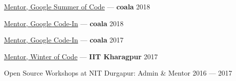 

\href{https://docs.naveenkumarsangi.me/gsoc-mentor.pdf}{Mentor, Google Summer of Code} --- \textbf{coala} \hfill 2018

\href{https://docs.naveenkumarsangi.me/gci-mentor-2018.pdf}{Mentor, Google Code-In} --- \textbf{coala} \hfill 2018

\href{https://docs.naveenkumarsangi.me/gci-mentor-2017.pdf}{Mentor, Google Code-In} --- \textbf{coala} \hfill 2017

\href{https://docs.naveenkumarsangi.me/kwoc.jpg}{Mentor, Winter of Code} --- \textbf{IIT Kharagpur} \hfill 2017

Open Source Workshops at NIT Durgapur: Admin \& Mentor \hfill 2016 --- 2017

